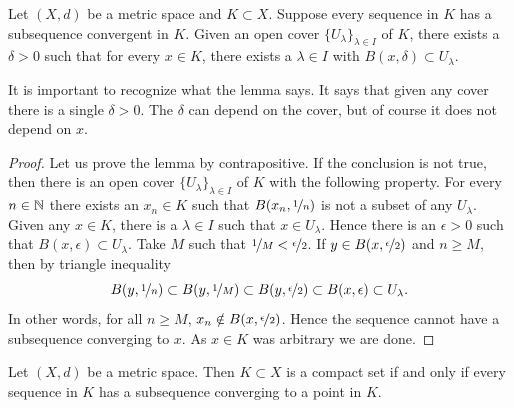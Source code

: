\begin{lemma}\label{ms:lebesgue}
Let $(X,d)$ be a metric space and $K \subset X$.  Suppose 
every sequence in $K$ has a subsequence convergent in $K$.  Given
an open cover $\{ U_\lambda \}_{\lambda \in I}$ of $K$, there exists a
$\delta > 0$ such that for every $x \in K$, there exists a $\lambda \in I$
with $B(x,\delta) \subset U_\lambda$.
\end{lemma}

It is important to recognize what the lemma says.  It says that given any
cover there is a single $\delta > 0$.  The $\delta$ can depend on the cover,
but of course it does not depend on $x$.

\begin{proof}
Let us prove the lemma by contrapositive.
If the conclusion is not true, then
there is
an open cover $\{ U_\lambda \}_{\lambda \in I}$ of $K$ with
the following property.
For every $n \in {\mathbb{N}}$ there exists an $x_n \in K$ such that
$B(x_n,\nicefrac{1}{n})$ is not a subset of any $U_\lambda$.
Given any $x \in K$, there is
a $\lambda \in I$ such that $x \in U_\lambda$.  Hence there
is an $\epsilon > 0$ 
such that $B(x,\epsilon) \subset U_\lambda$.  Take $M$ such that
$\nicefrac{1}{M} < \nicefrac{\epsilon}{2}$.  If $y \in 
B(x,\nicefrac{\epsilon}{2})$ and $n \geq M$, then
by triangle inequality
\begin{equation*}
B(y,\nicefrac{1}{n}) \subset
B(y,\nicefrac{1}{M}) \subset B(y,\nicefrac{\epsilon}{2}) \subset
B(x,\epsilon) \subset U_\lambda .
\end{equation*}
In other words, for all $n \geq M$, $x_n \notin B(x,\nicefrac{\epsilon}{2})$. 
Hence the sequence cannot have a subsequence converging to $x$.  As $x \in K$ was
arbitrary we are done.
\end{proof}

\begin{thm} \label{thm:mscompactisseqcpt}
Let $(X,d)$ be a metric space.  Then $K \subset X$ is a compact set if
and only if every sequence in $K$ has a subsequence converging to
a point in $K$.
\end{thm}

